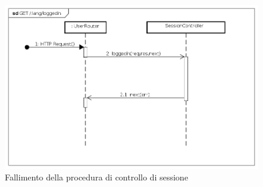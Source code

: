 \begin{itemize}
\label{Fallimento della procedura di controllo di sessione}
\begin{figure}[ht]
	\centering
	\includegraphics[scale=0.40]{UML/DiagrammiDiSequenza/Back-end/GET__lang_loggedin_failure.png}
	\caption{Fallimento della procedura di controllo di sessione}
\end{figure}
\FloatBarrier

\end{itemize}

